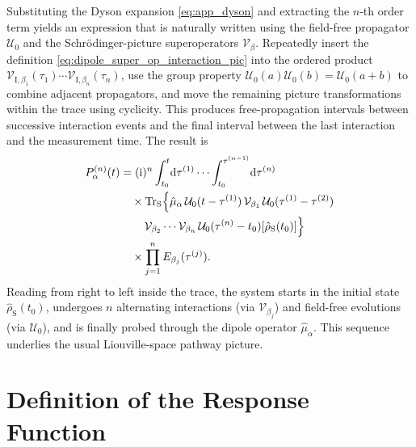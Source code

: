 Substituting the Dyson expansion \autoref{eq:app_dyson} and extracting the $n$-th order term yields an expression that is naturally written using the field-free propagator $\mathcal{U}_0$ and the Schr\"odinger-picture superoperators $\mathcal{V}_\beta$. Repeatedly insert the definition \autoref{eq:dipole_super_op_interaction_pic} into the ordered product
$\mathcal{V}_{\mathrm I,\beta_1}(\tau_1)\cdots \mathcal{V}_{\mathrm I,\beta_n}(\tau_n)$,
use the group property $\mathcal{U}_0(a)\mathcal{U}_0(b)=\mathcal{U}_0(a+b)$ to combine adjacent propagators, and move the remaining picture transformations within the trace using cyclicity. This produces free-propagation intervals between successive interaction events and the final interval between the last interaction and the measurement time. The result is
\begin{equation}
\begin{split}
P^{(n)}_\alpha(t)
&= (\mathrm{i})^n
\int_{t_0}^{t}\!\mathrm{d}\tau^{(1)}\cdots
\int_{t_0}^{\tau^{(n-1)}}\!\mathrm{d}\tau^{(n)}
\\
&\quad \times
\mathrm{Tr}_{\mathrm{S}}\Bigl\{
\hat{\mu}_\alpha
\,\mathcal{U}_0(t-\tau^{(1)})
\,\mathcal{V}_{\beta_1}
\,\mathcal{U}_0(\tau^{(1)}-\tau^{(2)})
\\
&\qquad
\,\mathcal{V}_{\beta_2}
\cdots
\mathcal{V}_{\beta_n}
\,\mathcal{U}_0(\tau^{(n)}-t_0)
[\hat{\rho}_{\mathrm{S}}(t_0)]
\Bigr\}
\\
&\quad \times
\prod_{j=1}^{n} E_{\beta_j}(\tau^{(j)}).
\end{split}
\label{eq:app_Pn_explicit}
\end{equation}
Reading from right to left inside the trace, the system starts in the initial state $\hat{\rho}_{\mathrm{S}}(t_0)$, undergoes $n$ alternating interactions (via $\mathcal{V}_{\beta_j}$) and field-free evolutions (via $\mathcal{U}_0$), and is finally probed through the dipole operator $\hat{\mu}_\alpha$. This sequence underlies the usual Liouville-space pathway picture.

\section{Definition of the Response Function}
\label{app:sec:response_function_definition}

